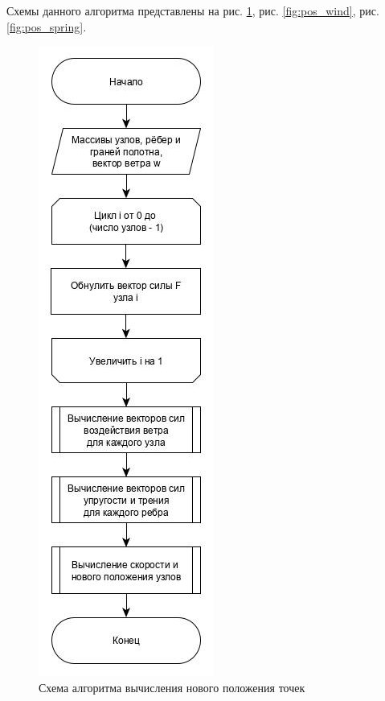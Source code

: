 Схемы данного алгоритма представлены на рис. \ref{fig:pos_overall}, рис. \ref{fig:pos_wind}, рис. \ref{fig:pos_spring}.

\pagebreak

\begin{figure}[ht!]
	\begin{center}
		\begin{minipage}[h]{0.4\linewidth}
			\includegraphics[scale=0.65]{pos_overall.jpg}
			\caption{Схема алгоритма вычисления нового положения точек}
			\label{fig:pos_overall}
		\end{minipage}
		\hfill 
		\begin{minipage}[h]{0.4\linewidth}

\end{minipage}
\end{center}
\end{figure}
